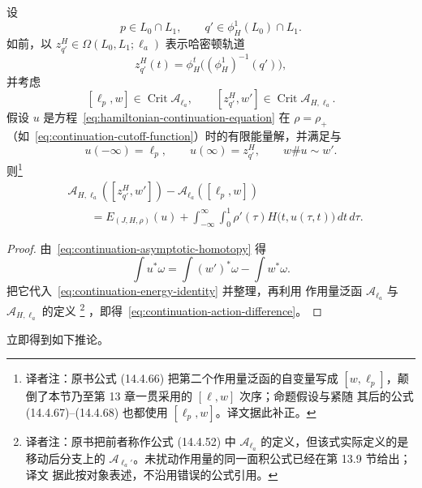 \begin{proposition}
\label{prop:forward-continuation-action-difference}
设
\[
  p\in L_0\cap L_1,
  \qquad
  q'\in\phi_H^1(L_0)\cap L_1.
\]
如前，以 $z_{q'}^H\in\Omega(L_0,L_1;\ell_a)$ 表示哈密顿轨道
\[
  z_{q'}^H(t)
  =
  \phi_H^t\bigl((\phi_H^1)^{-1}(q')\bigr),
\]
并考虑
\[
  [\ell_p,w]\in\operatorname{Crit}\mathcal A_{\ell_a},
  \qquad
  [z_{q'}^H,w']
  \in\operatorname{Crit}\mathcal A_{H,\ell_a}.
\]
假设 $u$ 是方程~\eqref{eq:hamiltonian-continuation-equation} 在
$\rho=\rho_+$（如~\eqref{eq:continuation-cutoff-function}）时的有限能量解，并满足\termAsymptoticCondition{}与\termHomotopyCondition{}
\begin{equation}
  u(-\infty)=\ell_p,
  \qquad
  u(\infty)=z_{q'}^H,
  \qquad
  w\#u\sim w'.
\label{eq:continuation-asymptotic-homotopy}
\end{equation}
则\footnote{译者注：原书公式 (14.4.66) 把第二个作用量泛函的自变量写成
$[w,\ell_p]$，颠倒了本节乃至第 13 章一贯采用的 $[\ell,w]$ 次序；命题假设与紧随
其后的公式 (14.4.67)--(14.4.68) 也都使用 $[\ell_p,w]$。译文据此补正。}
\begin{equation}
  \begin{aligned}
  &\mathcal A_{H,\ell_a}([z_{q'}^H,w'])
  -
  \mathcal A_{\ell_a}([\ell_p,w])\\
  &\qquad=
  E_{(J,H,\rho)}(u)
  +
  \int_{-\infty}^{\infty}\int_0^1
  \rho'(\tau)H\bigl(t,u(\tau,t)\bigr)\,dt\,d\tau.
  \end{aligned}
\label{eq:continuation-action-difference}
\end{equation}
\end{proposition}

\begin{proof}
由~\eqref{eq:continuation-asymptotic-homotopy} 得
\[
  \int u^*\omega
  =
  \int(w')^*\omega
  -
  \int w^*\omega.
\]
把它代入~\eqref{eq:continuation-energy-identity} 并整理，再利用
作用量泛函 $\mathcal A_{\ell_a}$ 与 $\mathcal A_{H,\ell_a}$ 的定义
\footnote{译者注：原书把前者称作公式 (14.4.52) 中
$\mathcal A_{\ell_a}$ 的定义，但该式实际定义的是移动后分支上的
$\mathcal A_{\ell_a'}$。未扰动作用量的同一面积公式已经在第 13.9 节给出；译文
据此按对象表述，不沿用错误的公式引用。}
，即得~\eqref{eq:continuation-action-difference}。
\end{proof}

立即得到如下推论。

